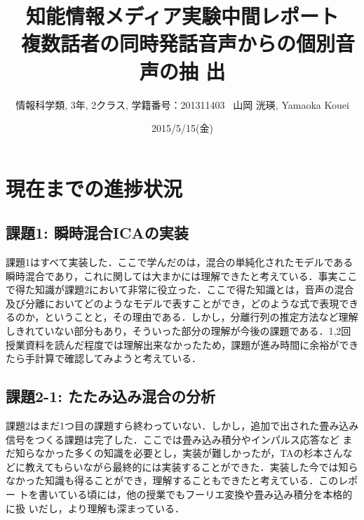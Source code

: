 \documentclass[a4j]{jarticle}
\title{知能情報メディア実験中間レポート \\ \ 複数話者の同時発話音声からの個別音声の抽
出}
\author{情報科学類, 3年, 2クラス, 学籍番号：201311403 \ 山岡 洸瑛, Yamaoka
Kouei}
\date{2015/5/15(金)}
\begin{document}
 \maketitle
\section*{現在までの進捗状況}
\subsection*{課題1: 瞬時混合ICAの実装}
課題1はすべて実装した．ここで学んだのは，混合の単純化されたモデルである
瞬時混合であり，これに関しては大まかには理解できたと考えている．事実ここ
で得た知識が課題2において非常に役立った．ここで得た知識とは，音声の混合
及び分離においてどのようなモデルで表すことができ，どのような式で表現でき
るのか，ということと，その理由である．しかし，分離行列の推定方法など理解
しきれていない部分もあり，そういった部分の理解が今後の課題である．1,2回
授業資料を読んだ程度では理解出来なかったため，課題が進み時間に余裕ができ
たら手計算で確認してみようと考えている．

\subsection*{課題2-1: たたみ込み混合の分析}
課題2はまだ1つ目の課題すら終わっていない．しかし，追加で出された畳み込み
信号をつくる課題は完了した．ここでは畳み込み積分やインパルス応答など
まだ知らなかった多くの知識を必要とし，実装が難しかったが，TAの杉本さんな
どに教えてもらいながら最終的には実装することができた．実装した今では知ら
なかった知識も得ることができ，理解することもできたと考えている．このレポー
トを書いている頃には，他の授業でもフーリエ変換や畳み込み積分を本格的に扱
いだし，より理解も深まっている．
\end{document}
